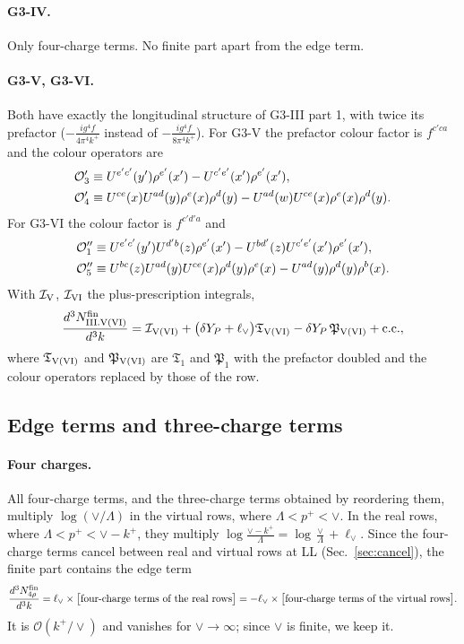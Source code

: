 \documentclass[aps,prd,onecolumn,superscriptaddress,nofootinbib,floatfix,longbibliography,11pt]{revtex4-2}
\numberwithin{equation}{section}
\newcommand{\lV}{\ell_{\vee}}
\newcommand{\Ord}{\mathcal{O}}
\begin{document}
\paragraph*{G3-IV.} Only four-charge terms. No finite part apart from the edge term.

\paragraph*{G3-V, G3-VI.} Both have exactly the longitudinal structure of G3-III part 1, with twice its prefactor ($-\frac{ig^4f}{4\pi^4k^+}$ instead of $-\frac{ig^4f}{8\pi^4k^+}$). For G3-V the prefactor colour factor is $f^{c'ca}$ and the colour operators are
\begin{align}
\Ord'_3\equiv{}& U^{e'c'}(y')\rho^{e'}(x')-U^{c'e'}(x')\rho^{e'}(x'),\notag\\
\Ord'_4\equiv{}& U^{ce}(x)U^{ad}(y)\rho^e(x)\rho^d(y)-U^{ad}(w)U^{ce}(x)\rho^e(x)\rho^d(y).
\end{align}
For G3-VI the colour factor is $f^{c'd'a}$ and
\begin{align}
\Ord''_1\equiv{}&U^{e'c'}(y')U^{d'b}(z)\rho^{e'}(x')-U^{bd'}(z)U^{c'e'}(x')\rho^{e'}(x'),\notag\\
\Ord''_5\equiv{}& U^{bc}(z)U^{ad}(y)U^{ce}(x)\rho^d(y)\rho^e(x)-U^{ad}(y)\rho^d(y)\rho^b(x).
\end{align}
With $\mathcal I_{\rm V}$, $\mathcal I_{\rm VI}$ the plus-prescription integrals,
\begin{equation}
\frac{d^3N^{\rm fin}_{\rm III.V(VI)}}{d^3k}=\mathcal I_{\rm V(VI)}+\big(\delta Y_P+\lV\big)\mathfrak T_{\rm V(VI)}-\delta Y_P\,\mathfrak P_{\rm V(VI)}+{\rm c.c.},
\end{equation}
where $\mathfrak T_{\rm V(VI)}$ and $\mathfrak P_{\rm V(VI)}$ are $\mathfrak T_1$ and $\mathfrak P_1$ with the prefactor doubled and the colour operators replaced by those of the row.

\subsection{Edge terms and three-charge terms}\label{sec:edge}

\paragraph*{Four charges.} All four-charge terms, and the three-charge terms obtained by reordering them, multiply $\log(\vee/\Lambda)$ in the virtual rows, where $\Lambda<p^+<\vee$. In the real rows, where $\Lambda<p^+<\vee-k^+$, they multiply $\log\frac{\vee-k^+}{\Lambda}=\log\frac{\vee}{\Lambda}+\lV$. Since the four-charge terms cancel between real and virtual rows at LL (Sec.~\ref{sec:cancel}), the finite part contains the edge term
\begin{equation}
\frac{d^3N^{\rm fin}_{4\rho}}{d^3k}=\lV\times\big[\text{four-charge terms of the real rows}\big]=-\lV\times\big[\text{four-charge terms of the virtual rows}\big].
\end{equation}
It is $\Ord(k^+/\vee)$ and vanishes for $\vee\to\infty$; since $\vee$ is finite, we keep it.
\end{document}
